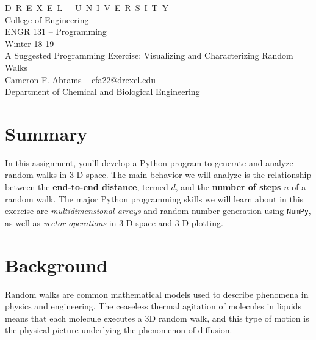 \documentclass[11pt]{article}
\newif \ifshowsolutions
\begin{document}
\begin{centering}
{\sc D\ R\ E\ X\ E\ L\ \ \ U\ N\ I\ V\ E\ R\ S\ I\ T\ Y}\\
College of Engineering\\
ENGR 131 -- Programming \\
Winter 18-19\\
A Suggested Programming Exercise:  Visualizing and Characterizing Random Walks\\
Cameron F. Abrams -- cfa22@drexel.edu\\
Department of Chemical and Biological Engineering\\
\ifshowsolutions
\textcolor{blue}{S\ O\ L\ U\ T\ I\ O\ N\ S}\\
\fi
\end{centering}

\section*{Summary}
In this assignment, you'll develop a Python program to generate and analyze random walks in 3-D space.  The main behavior we will analyze is the relationship between the {\bf end-to-end distance}, termed $d$, and the {\bf number of steps} $n$ of a random walk.  
The major Python programming skills we will learn about in this exercise are {\em multidimensional arrays} and random-number generation using {\tt NumPy}, as well as {\em vector operations} in 3-D space and 3-D plotting.

\section*{Background}

Random walks are common mathematical models used to describe phenomena in physics and engineering.  The ceaseless thermal agitation of molecules in liquids means that each molecule executes a 3D random walk, and this type of motion is the physical picture underlying the phenomenon of diffusion.  
\end{document}
